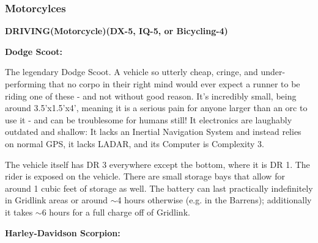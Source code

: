 \subsubsection{Motorcylces}

\textbf{DRIVING(Motorcycle)(DX-5, IQ-5, or Bicycling-4)}
\begin{center} 
	\begin{adjustwidth}{-9.5mm}{}
	\end{adjustwidth}
\end{center}

\textbf{Dodge Scoot:}

The legendary Dodge Scoot. A vehicle so utterly cheap, cringe, and under-performing that no corpo in their right mind would ever expect a runner to be riding one of these - and not without good reason. It's incredibly small, being around 3.5'x1.5'x4', meaning it is a serious pain for anyone larger than an orc to use it - and can be troublesome for humans still! It electronics are laughably outdated and shallow: It lacks an Inertial Navigation System and instead relies on normal GPS, it lacks LADAR, and its Computer is Complexity 3.

The vehicle itself has DR 3 everywhere except the bottom, where it is DR 1. The rider is exposed on the vehicle. There are small storage bays that allow for around 1 cubic feet of storage as well. The battery can last practically indefinitely in Gridlink areas or around $\sim$4 hours otherwise (e.g. in the Barrens); additionally it takes $\sim$6 hours for a full charge off of Gridlink.

\textbf{Harley-Davidson Scorpion:}

